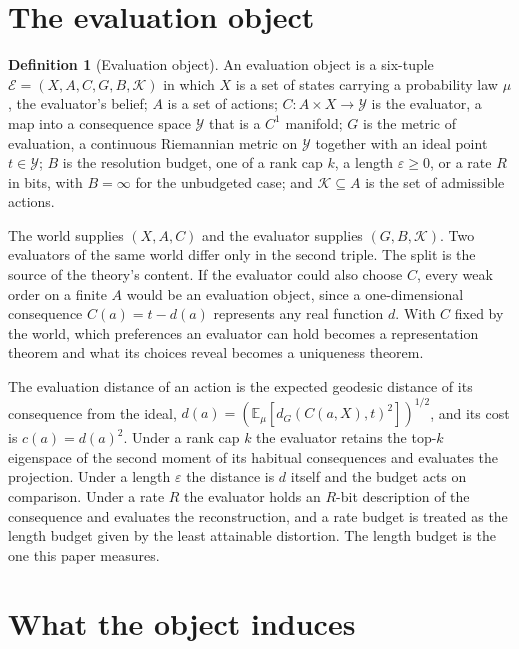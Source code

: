 \documentclass{article}
\theoremstyle{definition}
\newtheorem{definition}{Definition}
\theoremstyle{remark}
\newcommand{\Ev}{\mathcal{E}}
\newcommand{\K}{\mathcal{K}}
\newcommand{\Y}{\mathcal{Y}}
\newcommand{\Ex}{\mathbb{E}}
\newcommand{\dG}{d_{G}}
\begin{document}
\section{The evaluation object}
\label{sec:object}

\begin{definition}[Evaluation object]
\label{def:object}
An evaluation object is a six-tuple $\Ev=(X,A,C,G,B,\K)$ in which $X$ is a set of states carrying a probability law $\mu$, the evaluator's belief; $A$ is a set of actions; $C:A\times X\to\Y$ is the evaluator, a map into a consequence space $\Y$ that is a $C^{1}$ manifold; $G$ is the metric of evaluation, a continuous Riemannian metric on $\Y$ together with an ideal point $t\in\Y$; $B$ is the resolution budget, one of a rank cap $k$, a length $\varepsilon\ge0$, or a rate $R$ in bits, with $B=\infty$ for the unbudgeted case; and $\K\subseteq A$ is the set of admissible actions.
\end{definition}

The world supplies $(X,A,C)$ and the evaluator supplies $(G,B,\K)$.
Two evaluators of the same world differ only in the second triple.
The split is the source of the theory's content.
If the evaluator could also choose $C$, every weak order on a finite $A$ would be an evaluation object, since a one-dimensional consequence $C(a)=t-d(a)$ represents any real function $d$.
With $C$ fixed by the world, which preferences an evaluator can hold becomes a representation theorem and what its choices reveal becomes a uniqueness theorem.

The evaluation distance of an action is the expected geodesic distance of its consequence from the ideal, $d(a)=(\Ex_{\mu}[\dG(C(a,X),t)^{2}])^{1/2}$, and its cost is $c(a)=d(a)^{2}$.
Under a rank cap $k$ the evaluator retains the top-$k$ eigenspace of the second moment of its habitual consequences and evaluates the projection.
Under a length $\varepsilon$ the distance is $d$ itself and the budget acts on comparison.
Under a rate $R$ the evaluator holds an $R$-bit description of the consequence and evaluates the reconstruction, and a rate budget is treated as the length budget given by the least attainable distortion.
The length budget is the one this paper measures.

\section{What the object induces}
\label{sec:derive}
\end{document}
